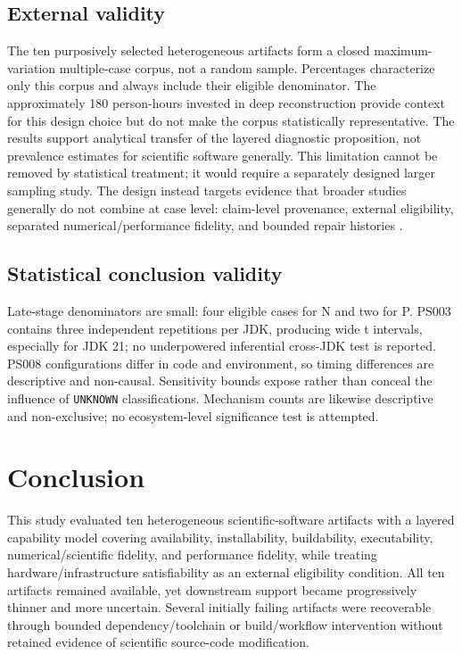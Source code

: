 \documentclass[a4paper,fleqn]{cas-dc}
\begin{document}
\subsection{External validity}

The ten purposively selected heterogeneous artifacts form a closed maximum-variation multiple-case corpus, not a random sample. Percentages characterize only this corpus and always include their eligible denominator. The approximately 180 person-hours invested in deep reconstruction provide context for this design choice but do not make the corpus statistically representative. The results support analytical transfer of the layered diagnostic proposition, not prevalence estimates for scientific software generally. This limitation cannot be removed by statistical treatment; it would require a separately designed larger sampling study. The design instead targets evidence that broader studies generally do not combine at case level: claim-level provenance, external eligibility, separated numerical/performance fidelity, and bounded repair histories \citep{runeson2009guidelines,muttakin2026openscience}.

\subsection{Statistical conclusion validity}

Late-stage denominators are small: four eligible cases for N and two for P. PS003 contains three independent repetitions per JDK, producing wide t intervals, especially for JDK 21; no underpowered inferential cross-JDK test is reported. PS008 configurations differ in code and environment, so timing differences are descriptive and non-causal. Sensitivity bounds expose rather than conceal the influence of \texttt{UNKNOWN} classifications. Mechanism counts are likewise descriptive and non-exclusive; no ecosystem-level significance test is attempted.

\section{Conclusion}

This study evaluated ten heterogeneous scientific-software artifacts with a layered capability model covering availability, installability, buildability, executability, numerical/scientific fidelity, and performance fidelity, while treating hardware/infrastructure satisfiability as an external eligibility condition. All ten artifacts remained available, yet downstream support became progressively thinner and more uncertain. Several initially failing artifacts were recoverable through bounded dependency/toolchain or build/workflow intervention without retained evidence of scientific source-code modification.
\end{document}

